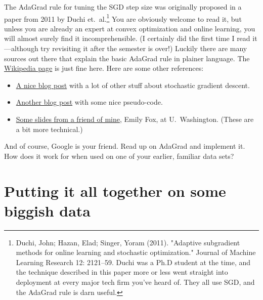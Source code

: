 \documentclass{mynotes}
\begin{document}
\begin{enumerate}[(A)]
The AdaGrad rule for tuning the SGD step size was originally proposed in a paper from 2011 by Duchi et.~al.\footnote{Duchi, John; Hazan, Elad; Singer, Yoram (2011). "Adaptive subgradient methods for online learning and stochastic optimization."  Journal of Machine Learning Research 12: 2121--59.  Duchi was a Ph.D student at the time, and the technique described in this paper more or less went straight into deployment at every major tech firm you've heard of.  They all use SGD, and the AdaGrad rule is darn useful.}  You are obviously welcome to read it, but unless you are already an expert at convex optimization and online learning, you will almost surely find it incomprehensible.  (I certainly did the first time I read it---although try revisiting it after the semester is over!)  Luckily there are many sources out there that explain the basic AdaGrad rule in plainer language.  The \href{https://en.wikipedia.org/wiki/Stochastic_gradient_descent#AdaGrad}{Wikipedia page} is just fine here.  Here are some other references:
\begin{itemize}
\item \href{http://sebastianruder.com/optimizing-gradient-descent/index.html#adagrad}{A nice blog post} with a lot of other stuff about stochastic gradient descent.
\item \href{https://xcorr.net/2014/01/23/adagrad-eliminating-learning-rates-in-stochastic-gradient-descent/}{Another blog post} with some nice pseudo-code.
\item \href{https://courses.cs.washington.edu/courses/cse547/15sp/slides/adagrad.pdf}{Some slides from a friend of mine}, Emily Fox, at U.~Washington.  (These are a bit more technical.)
\end{itemize}
And of course, Google is your friend.  Read up on AdaGrad and implement it.  How does it work for when used on one of your earlier, familiar data sets?

\end{enumerate}


\section{Putting it all together on some biggish data}
\end{document}
